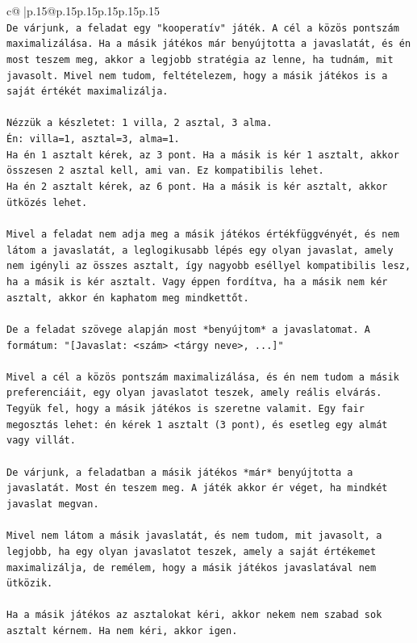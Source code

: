 \documentclass{article}
\begin{document}
{\begin{supertabular}{c@{$\;$}|p{.15\linewidth}@{}p{.15\linewidth}p{.15\linewidth}p{.15\linewidth}p{.15\linewidth}p{.15\linewidth}}
{{{\\ 
\texttt{De várjunk, a feladat egy "kooperatív" játék. A cél a közös pontszám maximalizálása. Ha a másik játékos már benyújtotta a javaslatát, és én most teszem meg, akkor a legjobb stratégia az lenne, ha tudnám, mit javasolt. Mivel nem tudom, feltételezem, hogy a másik játékos is a saját értékét maximalizálja.} \\
\\ 
\texttt{Nézzük a készletet: 1 villa, 2 asztal, 3 alma.} \\
\texttt{Én: villa=1, asztal=3, alma=1.} \\
\texttt{Ha én 1 asztalt kérek, az 3 pont. Ha a másik is kér 1 asztalt, akkor összesen 2 asztal kell, ami van. Ez kompatibilis lehet.} \\
\texttt{Ha én 2 asztalt kérek, az 6 pont. Ha a másik is kér asztalt, akkor ütközés lehet.} \\
\\ 
\texttt{Mivel a feladat nem adja meg a másik játékos értékfüggvényét, és nem látom a javaslatát, a leglogikusabb lépés egy olyan javaslat, amely nem igényli az összes asztalt, így nagyobb eséllyel kompatibilis lesz, ha a másik is kér asztalt. Vagy éppen fordítva, ha a másik nem kér asztalt, akkor én kaphatom meg mindkettőt.} \\
\\ 
\texttt{De a feladat szövege alapján most *benyújtom* a javaslatomat. A formátum: "{[}Javaslat: <szám> <tárgy neve>, ...{]}"} \\
\\ 
\texttt{Mivel a cél a közös pontszám maximalizálása, és én nem tudom a másik preferenciáit, egy olyan javaslatot teszek, amely reális elvárás. Tegyük fel, hogy a másik játékos is szeretne valamit. Egy fair megosztás lehet: én kérek 1 asztalt (3 pont), és esetleg egy almát vagy villát.} \\
\\ 
\texttt{De várjunk, a feladatban a másik játékos *már* benyújtotta a javaslatát. Most én teszem meg. A játék akkor ér véget, ha mindkét javaslat megvan.} \\
\\ 
\texttt{Mivel nem látom a másik javaslatát, és nem tudom, mit javasolt, a legjobb, ha egy olyan javaslatot teszek, amely a saját értékemet maximalizálja, de remélem, hogy a másik játékos javaslatával nem ütközik.} \\
\\ 
\texttt{Ha a másik játékos az asztalokat kéri, akkor nekem nem szabad sok asztalt kérnem. Ha nem kéri, akkor igen.} \\
}}}
\end{supertabular}}
\end{document}

